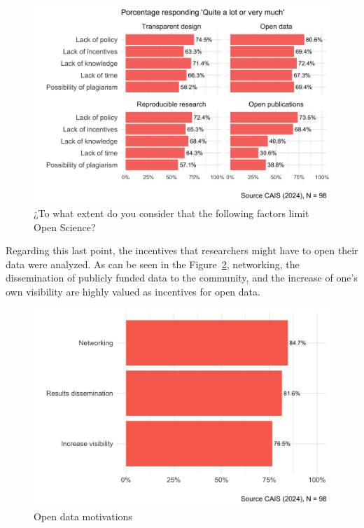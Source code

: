 \documentclass[
  letterpaper,
  DIV=11,
  numbers=noendperiod]{scrartcl}
\begin{document}
\begin{figure}[H]

{\centering \includegraphics{paper_files/figure-pdf/fig-barreras-1.png}

}

\caption{\label{fig-barreras}¿To what extent do you consider that the
following factors limit Open Science?}

\end{figure}

Regarding this last point, the incentives that researchers might have to
open their data were analyzed. As can be seen in the
Figure~\ref{fig-motivaciones}, networking, the dissemination of publicly
funded data to the community, and the increase of one's own visibility
are highly valued as incentives for open data.

\begin{figure}[H]

{\centering \includegraphics{paper_files/figure-pdf/fig-motivaciones-1.png}

}

\caption{\label{fig-motivaciones}Open data motivations}

\end{figure}
\end{document}
